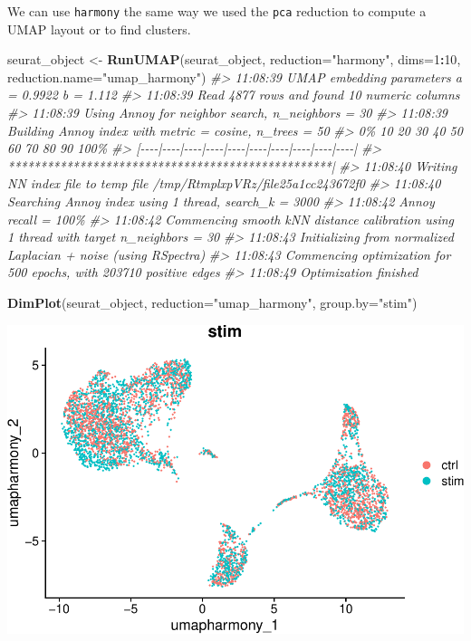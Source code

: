 \documentclass[
]{book}
\newenvironment{Shaded}{\begin{snugshade}}{\end{snugshade}}
\newcommand{\AttributeTok}[1]{\textcolor[rgb]{0.13,0.29,0.53}{#1}}
\newcommand{\CommentTok}[1]{\textcolor[rgb]{0.56,0.35,0.01}{\textit{#1}}}
\newcommand{\DecValTok}[1]{\textcolor[rgb]{0.00,0.00,0.81}{#1}}
\newcommand{\FunctionTok}[1]{\textcolor[rgb]{0.13,0.29,0.53}{\textbf{#1}}}
\newcommand{\NormalTok}[1]{#1}
\newcommand{\OtherTok}[1]{\textcolor[rgb]{0.56,0.35,0.01}{#1}}
\newcommand{\SpecialCharTok}[1]{\textcolor[rgb]{0.81,0.36,0.00}{\textbf{#1}}}
\newcommand{\StringTok}[1]{\textcolor[rgb]{0.31,0.60,0.02}{#1}}
\begin{document}
We can use \texttt{harmony} the same way we used the \texttt{pca} reduction to compute a UMAP layout or to find clusters.

\begin{Shaded}
\begin{Highlighting}[]
\NormalTok{seurat\_object }\OtherTok{\textless{}{-}} \FunctionTok{RunUMAP}\NormalTok{(seurat\_object, }\AttributeTok{reduction=}\StringTok{"harmony"}\NormalTok{, }\AttributeTok{dims=}\DecValTok{1}\SpecialCharTok{:}\DecValTok{10}\NormalTok{, }\AttributeTok{reduction.name=}\StringTok{"umap\_harmony"}\NormalTok{)}
\CommentTok{\#\textgreater{} 11:08:39 UMAP embedding parameters a = 0.9922 b = 1.112}
\CommentTok{\#\textgreater{} 11:08:39 Read 4877 rows and found 10 numeric columns}
\CommentTok{\#\textgreater{} 11:08:39 Using Annoy for neighbor search, n\_neighbors = 30}
\CommentTok{\#\textgreater{} 11:08:39 Building Annoy index with metric = cosine, n\_trees = 50}
\CommentTok{\#\textgreater{} 0\%   10   20   30   40   50   60   70   80   90   100\%}
\CommentTok{\#\textgreater{} [{-}{-}{-}{-}|{-}{-}{-}{-}|{-}{-}{-}{-}|{-}{-}{-}{-}|{-}{-}{-}{-}|{-}{-}{-}{-}|{-}{-}{-}{-}|{-}{-}{-}{-}|{-}{-}{-}{-}|{-}{-}{-}{-}|}
\CommentTok{\#\textgreater{} **************************************************|}
\CommentTok{\#\textgreater{} 11:08:40 Writing NN index file to temp file /tmp/RtmplxpVRz/file25a1cc243672f0}
\CommentTok{\#\textgreater{} 11:08:40 Searching Annoy index using 1 thread, search\_k = 3000}
\CommentTok{\#\textgreater{} 11:08:42 Annoy recall = 100\%}
\CommentTok{\#\textgreater{} 11:08:42 Commencing smooth kNN distance calibration using 1 thread with target n\_neighbors = 30}
\CommentTok{\#\textgreater{} 11:08:43 Initializing from normalized Laplacian + noise (using RSpectra)}
\CommentTok{\#\textgreater{} 11:08:43 Commencing optimization for 500 epochs, with 203710 positive edges}
\CommentTok{\#\textgreater{} 11:08:49 Optimization finished}

\FunctionTok{DimPlot}\NormalTok{(seurat\_object, }\AttributeTok{reduction=}\StringTok{"umap\_harmony"}\NormalTok{, }\AttributeTok{group.by=}\StringTok{"stim"}\NormalTok{)}
\end{Highlighting}
\end{Shaded}

\includegraphics{scRNAseqInR_ABACBS_2024_Doco_files/figure-latex/harmony4-1.pdf}
\end{document}
